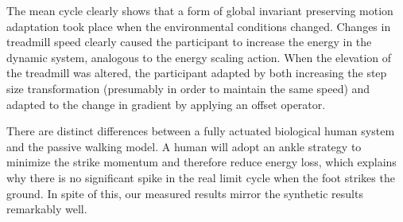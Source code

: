 The mean cycle clearly shows that a form of global invariant preserving motion adaptation took place when the environmental conditions changed. 
Changes in treadmill speed clearly caused the participant to increase the energy in the dynamic system, analogous to the energy scaling action. 
When the elevation of the treadmill was altered, the participant adapted by both increasing the step size transformation (presumably in order to maintain the same speed) and adapted to the change in gradient by applying an offset operator.

There are distinct differences between a fully actuated biological human system and the passive walking model.
A human will adopt an ankle strategy to minimize the strike momentum and therefore reduce energy loss, which explains why there is no significant spike in the real limit cycle when the foot strikes the ground. 
In spite of this, our measured results mirror the synthetic results remarkably well.






